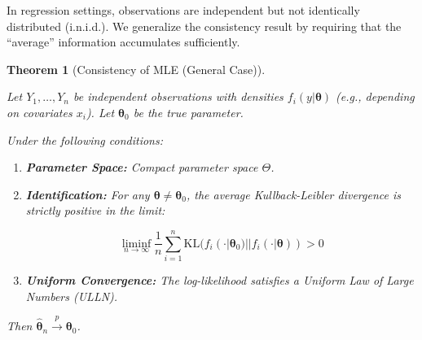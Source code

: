 \documentclass[
  letterpaper,
  DIV=11,
  numbers=noendperiod]{scrreprt}
\renewcommand{\[}{\begin{equation}}
\renewcommand{\]}{\end{equation}}
\theoremstyle{definition}
\theoremstyle{plain}
\theoremstyle{plain}
\theoremstyle{plain}
\newtheorem{theorem}{Theorem}[chapter]
\theoremstyle{definition}
\theoremstyle{plain}
\theoremstyle{remark}
\begin{document}
In regression settings, observations are independent but not identically
distributed (i.n.i.d.). We generalize the consistency result by
requiring that the ``average'' information accumulates sufficiently.

\begin{theorem}[Consistency of MLE (General
Case)]\protect\hypertarget{thm-mle-consistency-general}{}\label{thm-mle-consistency-general}

Let \(Y_1, \dots, Y_n\) be independent observations with densities
\(f_i(y|\boldsymbol{\theta})\) (e.g., depending on covariates \(x_i\)).
Let \(\boldsymbol{\theta}_0\) be the true parameter.

Under the following conditions:

\begin{enumerate}
\def\labelenumi{\arabic{enumi}.}
\item
  \textbf{Parameter Space:} Compact parameter space \(\Theta\).
\item
  \textbf{Identification:} For any
  \(\boldsymbol{\theta} \neq \boldsymbol{\theta}_0\), the average
  Kullback-Leibler divergence is strictly positive in the limit:

  \[\liminf_{n \to \infty} \frac{1}{n} \sum_{i=1}^n \text{KL}(f_i(\cdot|\boldsymbol{\theta}_0) || f_i(\cdot|\boldsymbol{\theta})) > 0\]
\item
  \textbf{Uniform Convergence:} The log-likelihood satisfies a Uniform
  Law of Large Numbers (ULLN).
\end{enumerate}

Then
\(\hat{\boldsymbol{\theta}}_n \xrightarrow{p} \boldsymbol{\theta}_0\).

\end{theorem}
\end{document}
